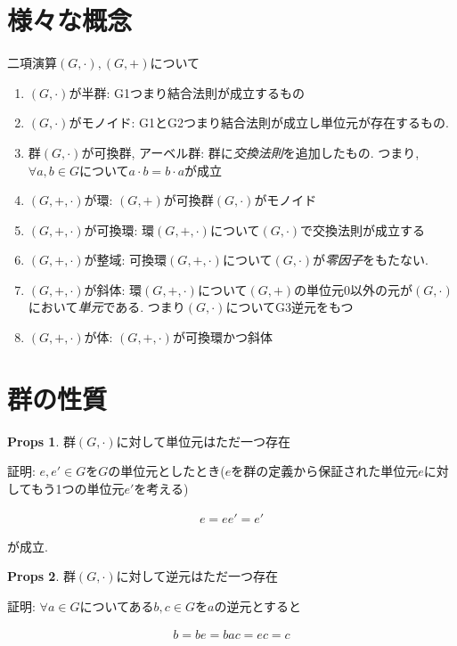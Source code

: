 \documentclass[dvipdfmx]{jsarticle}
\theoremstyle{definition}
\newtheorem{props}{Props}
\numberwithin{equation}{section}
\numberwithin{props}{section}
\numberwithin{definition}{section}
\numberwithin{note}{section}
\begin{document}
\section{様々な概念}
二項演算$(G,\cdot),(G,+)$について
\begin{enumerate}
     \item $(G,\cdot)$が半群: G1つまり結合法則が成立するもの
     \item $(G,\cdot)$がモノイド: G1とG2つまり結合法則が成立し単位元が存在するもの.

     \item 群$(G,\cdot)$が可換群, アーベル群: 群に\emph{交換法則}を追加したもの. つまり, $\forall a,b\in G$について$a\cdot b=b\cdot a$が成立
     \item $(G,+,\cdot)$が環: $(G,+)$が可換群$(G,\cdot)$がモノイド
     \item $(G,+,\cdot)$が可換環: 環$(G,+,\cdot)$について$(G,\cdot)$で交換法則が成立する
     \item $(G,+,\cdot)$が整域: 可換環$(G,+,\cdot)$について$(G,\cdot)$が\emph{零因子}をもたない.
     \item $(G,+,\cdot)$が斜体: 環$(G,+,\cdot)$について$(G,+)$の単位元$0$以外の元が$(G,\cdot)$において\emph{単元}である. つまり$(G,\cdot)$についてG3逆元をもつ
     \item $(G,+,\cdot)$が体: $(G,+,\cdot)$が可換環かつ斜体
\end{enumerate}

\section{群の性質}
\begin{props}
     群$(G,\cdot)$に対して単位元はただ一つ存在
\end{props}

証明: $e,e'\in G$を$G$の単位元としたとき($e$を群の定義から保証された単位元$e$に対してもう1つの単位元$e'$を考える)

\begin{align}
     e=ee'=e'
\end{align}

が成立.
\begin{props}
     群$(G,\cdot)$に対して逆元はただ一つ存在
\end{props}


証明: $\forall a\in G$についてある$b,c\in G$を$a$の逆元とすると

\begin{align}
     b=be=bac=ec=c
\end{align}
\end{document}
